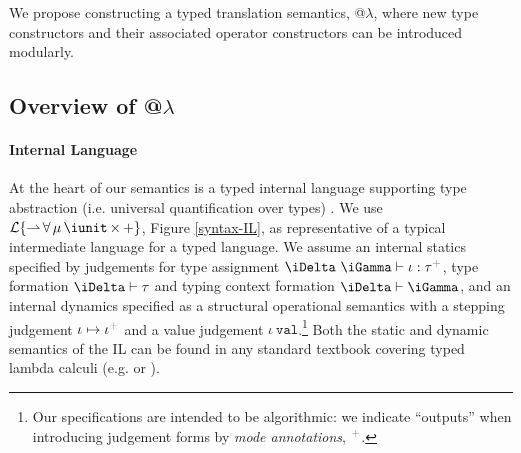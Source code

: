 \begin{contribution}
We propose constructing a typed translation semantics, @$\lambda$, where new type constructors and their associated operator constructors can be introduced modularly. %
\end{contribution}

\subsection{Overview of @$\lambda$}\label{atlam}\label{overview}

\paragraph{Internal Language} 
At the heart of our semantics is a typed internal language supporting type abstraction (i.e. universal quantification over types) \cite{Reynolds94anintroduction}. We use {$\mathcal{L}\{{\rightharpoonup}\,{\forall}\,{\mu}\,{\iunit}\,{\times}\,{+}\}$}, Figure \ref{syntax-IL}, as representative of a typical intermediate language for a typed language. %
We assume an internal statics specified by judgements for type assignment {$\iDelta~\iGamma \vdash \iota : \tau\moutput$}, type formation {$\iDelta \vdash \tau$} and typing context formation { $\iDelta \vdash \iGamma$}, and an 
internal dynamics specified as a structural operational semantics with a stepping judgement {\small $\iota \mapsto \iota\moutput$} and a value judgement {$\iota~\mathtt{val}$}.\footnote{Our specifications are intended to be algorithmic: we indicate ``outputs'' when introducing judgement forms by \emph{mode annotations}, $\moutput$.} Both the static and dynamic semantics of the IL can be found in any standard textbook covering typed lambda calculi (e.g. \cite{pfpl} or \cite{tapl}).


